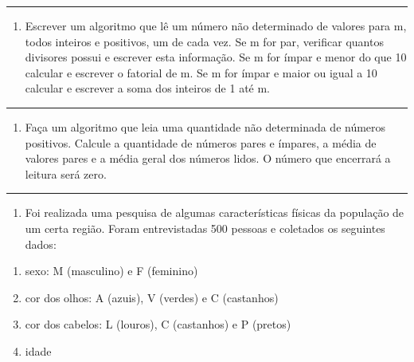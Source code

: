 \documentclass[12pt,a4paper]{article}
\providecommand{\tightlist}{%
      \setlength{\itemsep}{0pt}\setlength{\parskip}{0pt}}
\begin{document}
    \begin{center}\rule{0.5\linewidth}{0.5pt}\end{center}

\begin{enumerate}
\def\labelenumi{\arabic{enumi}.}
\setcounter{enumi}{8}
\tightlist
\item
  Escrever um algoritmo que lê um número não determinado de valores para
  m, todos inteiros e positivos, um de cada vez. Se m for par, verificar
  quantos divisores possui e escrever esta informação. Se m for ímpar e
  menor do que 10 calcular e escrever o fatorial de m. Se m for ímpar e
  maior ou igual a 10 calcular e escrever a soma dos inteiros de 1 até
  m.
\end{enumerate}

    \begin{center}\rule{0.5\linewidth}{0.5pt}\end{center}

\begin{enumerate}
\def\labelenumi{\arabic{enumi}.}
\setcounter{enumi}{9}
\tightlist
\item
  Faça um algoritmo que leia uma quantidade não determinada de números
  positivos. Calcule a quantidade de números pares e ímpares, a média de
  valores pares e a média geral dos números lidos. O número que
  encerrará a leitura será zero.
\end{enumerate}

    \begin{center}\rule{0.5\linewidth}{0.5pt}\end{center}

\begin{enumerate}
\def\labelenumi{\arabic{enumi}.}
\setcounter{enumi}{10}
\tightlist
\item
  Foi realizada uma pesquisa de algumas características físicas da
  população de um certa região. Foram entrevistadas 500 pessoas e
  coletados os seguintes dados:
\end{enumerate}

\begin{enumerate}
\def\labelenumi{\alph{enumi})}
\item
  sexo: M (masculino) e F (feminino)
\item
  cor dos olhos: A (azuis), V (verdes) e C (castanhos)
\item
  cor dos cabelos: L (louros), C (castanhos) e P (pretos)
\item
  idade
\end{enumerate}
\end{document}
